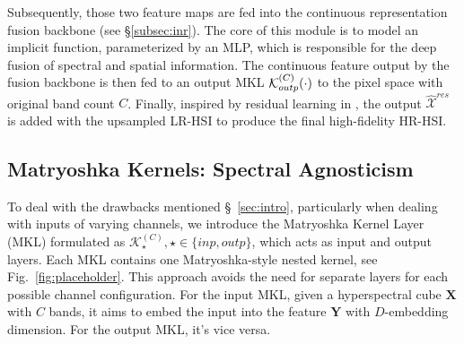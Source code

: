 Subsequently, those two feature maps are fed into the continuous representation fusion backbone (see \S \ref{subsec:inr}). The core of this module is to model an implicit function, parameterized by an MLP, which is responsible for the deep fusion of spectral and spatial information.
The continuous feature output by the fusion backbone is then fed to an output MKL $\mathcal K_{outp}^{(C)}(\cdot)$ to the pixel space with original band count $C$. 
Finally, inspired by residual learning in \cite{he2016deep}, the output $\mathcal{\widehat X}^{res}$ is added with the upsampled LR-HSI to produce the final high-fidelity HR-HSI.




\subsection{Matryoshka Kernels: Spectral Agnosticism}
\label{subsec:mk}
To deal with the drawbacks mentioned \S~\ref{sec:intro}, particularly when dealing with inputs of varying channels, we introduce the Matryoshka Kernel Layer (MKL) formulated as $\mathcal K_{\star}^{(C)},\star\in\{inp, outp\}$, which acts as input and output layers. Each MKL contains one Matryoshka-style nested kernel, see Fig.~\ref{fig:placeholder}.
This approach avoids the need for separate layers for each possible channel configuration. 
For the input MKL, given a hyperspectral cube $\mathbf{X}$ with $C$ bands, it aims to embed the input into the feature $\mathbf Y$ with $D$-embedding dimension. For the output MKL, it's vice versa.


